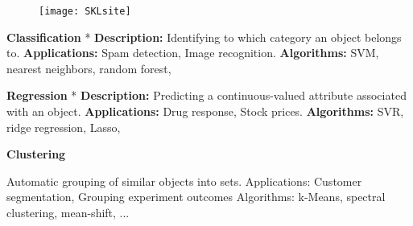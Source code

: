 

 
% 
%  
%  
% 
% 
% 
%
%
% 
% 
%
% 
%
% 
 
 \begin{figure}
\centering
\texttt{[image: SKLsite]}

\end{figure}

 
 
  
\textbf{Classification}
* \textbf{Description:} Identifying to which category an object belongs to.
 \textbf{Applications:} Spam detection, Image recognition.
 \textbf{Algorithms:} SVM, nearest neighbors, random forest, 
 

 
 
 
\textbf{Regression}
* \textbf{Description:} Predicting a continuous-valued attribute associated with an object.
 \textbf{Applications:} Drug response, Stock prices.
 \textbf{Algorithms:} SVR, ridge regression, Lasso, 

 

 
 
  
\textbf{Clustering}

Automatic grouping of similar objects into sets.
Applications: Customer segmentation, Grouping experiment outcomes
Algorithms: k-Means, spectral clustering, mean-shift, ...
 
